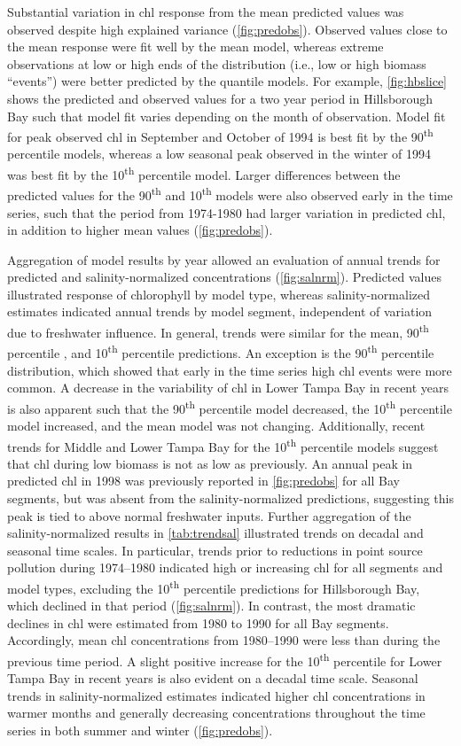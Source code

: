 \documentclass{svjour3}\usepackage[]{graphicx}\usepackage[]{color}
\newcommand{\nine}{90\textsuperscript{th} percentile }
\newcommand{\ten}{10\textsuperscript{th} percentile }
\begin{document}
Substantial variation in \ac{chl} response from the mean predicted values was observed despite high explained variance (\cref{fig:predobs}).  Observed values close to the mean response were fit well by the mean model, whereas extreme observations at low or high ends of the distribution (i.e., low or high biomass ``events'') were better predicted by the quantile models. For example, \cref{fig:hbslice} shows the predicted and observed values for a two year period in Hillsborough Bay such that model fit varies depending on the month of observation.  Model fit for peak observed \ac{chl} in September and October of 1994 is best fit by the \nine models, whereas a low seasonal peak observed in the winter of 1994 was best fit by the \ten model.  Larger differences between the predicted values for the 90\textsuperscript{th} and 10\textsuperscript{th} models were also observed early in the time series, such that the period from 1974-1980 had larger variation in predicted \ac{chl}, in addition to higher mean values (\cref{fig:predobs}).  

Aggregation of model results by year allowed an evaluation of annual trends for predicted and salinity-normalized concentrations (\cref{fig:salnrm}).  Predicted values illustrated response of chlorophyll by model type, whereas salinity-normalized estimates indicated annual trends by model segment, independent of variation due to freshwater influence.  In general, trends were similar for the mean, \nine, and \ten predictions.  An exception is the \nine distribution, which showed that early in the time series high \ac{chl} events were more common.  A decrease in the variability of \ac{chl} in Lower Tampa Bay in recent years is also apparent such that the \nine model decreased, the \ten model increased, and the mean model was not changing.  Additionally, recent trends for Middle and Lower Tampa Bay for the \ten models suggest that \ac{chl} during low biomass is not as low as previously.  An annual peak in predicted \ac{chl} in 1998 was previously reported in \cref{fig:predobs} for all Bay segments, but was absent from the salinity-normalized predictions, suggesting this peak is tied to above normal freshwater inputs. Further aggregation of the salinity-normalized results in \cref{tab:trendsal} illustrated trends on decadal and seasonal time scales.  In particular, trends prior to reductions in point source pollution during 1974--1980 indicated high or increasing \ac{chl} for all segments and model types, excluding the \ten predictions for Hillsborough Bay, which declined in that period (\cref{fig:salnrm}).  In contrast, the most dramatic declines in \ac{chl} were estimated from 1980 to 1990 for all Bay segments.  Accordingly, mean \ac{chl} concentrations from 1980--1990 were less than during the previous time period.  A slight positive increase for the \ten for Lower Tampa Bay in recent years is also evident on a decadal time scale.  Seasonal trends in salinity-normalized estimates indicated higher \ac{chl} concentrations in warmer months and generally decreasing concentrations throughout the time series in both summer and winter (\cref{fig:predobs}).
\end{document}
